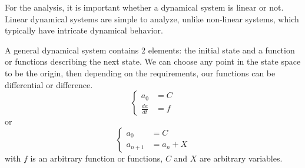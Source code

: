 \documentclass[a4paper]{article}
\begin{document}
For the analysis, it is important whether a dynamical system is linear or not.
Linear dynamical systems are simple to analyze, unlike non-linear systems, which typically have intricate dynamical behavior.

A general dynamical system contains 2 elements: the initial state and a function or functions describing the next state.
We can choose any point in the state space to be the origin, then depending on the requirements, our functions can be differential or difference.
\begin{equation*}
  \begin{cases}
    a_0           & = C \\
    \frac{da}{dt} & = f
  \end{cases}
\end{equation*}
or
\begin{equation*}
  \begin{cases}
    a_0       & = C       \\
    a_{n + 1} & = a_n + X
  \end{cases}
\end{equation*}
with \(f\) is an arbitrary function or functions, \(C\) and \(X\) are arbitrary variables.
\end{document}
